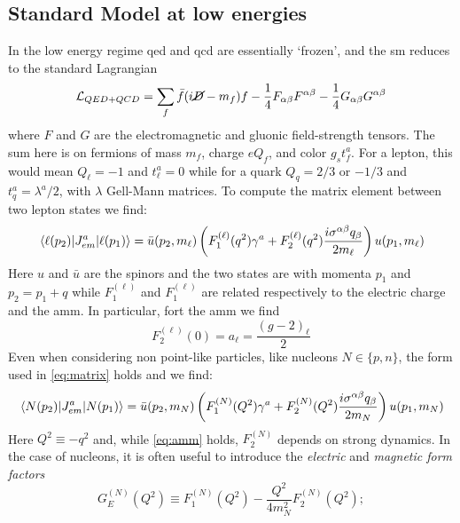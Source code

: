 \begin{refsection}
    \subsection{Standard Model at low energies}
        In the low energy regime \gls{qed} and \gls{qcd} are essentially `frozen', and the \gls{sm} reduces to the standard Lagrangian
        \begin{equation}
            \mathcal{L}_{QED+QCD}=\sum_{f}\bar{f}(i\cancel{D}-m_f)f-\frac{1}{4}F_{\alpha\beta}F^{\alpha\beta}-\frac{1}{4}G_{\alpha\beta}G^{\alpha\beta}
            \label{eq:sm}
        \end{equation}
        where $F$ and $G$ are the electromagnetic and gluonic field-strength tensors. The sum here is on fermions of mass $m_f$, charge $eQ_f$, and color $g_st^a_f$. For a lepton, this would mean $Q_\ell=-1$ and $t^a_\ell=0$ while for a quark $Q_q=2/3$ or $-1/3$ and $t^a_q=\lambda^a/2$, with $\lambda$ Gell-Mann matrices.
        To compute the matrix element between two lepton states we find:
        \begin{equation}
            \matrixel{\ell(p_2)}{J^a_{em}}{\ell(p_1)} =\bar{u}(p_2,m_\ell)\left(F^{(\ell)}_1(q^2)\gamma^a+F^{(\ell)}_2(q^2)\frac{i\sigma^{\alpha\beta}q_\beta}{2m_\ell} \right)u(p_1,m_\ell)
            \label{eq:matrix}
        \end{equation}
        Here $u$ and $\bar{u}$ are the spinors and the two states are with momenta $p_1$ and $p_2=p_1+q$ while $F_1^{(\ell)}$ and $F_1^{(\ell)}$ are related respectively to the electric charge and the \gls{amm}. 
        In particular, fort the \gls{amm} we find  
        \begin{equation}
            F_2^{(\ell)}(0) = a_\ell = \frac{(g-2)_\ell}{2}  
            \label{eq:amm}
        \end{equation}
        Even when considering non point-like particles, like nucleons $N\in \{p,n\}$, the form used in \ref{eq:matrix} holds and we find:
        \begin{equation}
            \matrixel{N(p_2)}{J^a_{em}}{N(p_1)} =\bar{u}(p_2,m_N)\left(F^{(N)}_1(Q^2)\gamma^a+F^{(N)}_2(Q^2)\frac{i\sigma^{\alpha\beta}q_\beta}{2m_N} \right)u(p_1,m_N)
        \end{equation}
        Here $Q^2\equiv -q^2$ and, while \ref{eq:amm} holds, $F_2^{(N)}$ depends on strong dynamics.
        In the case of nucleons, it is often useful to introduce the \textit{electric} and \textit{magnetic form factors}
        \begin{equation*}
            G^{(N)}_E(Q^2)\equiv F_1^{(N)}(Q^2)-\frac{Q^2}{4m_N^2}F_2^{(N)}(Q^2);

\end{equation*}
\end{refsection}
